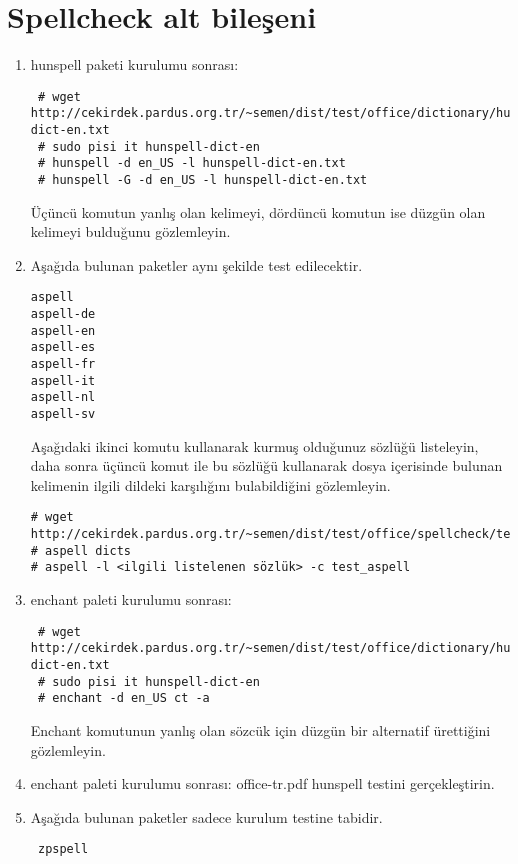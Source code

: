 \documentclass[a4paper,10pt]{article}
\begin{document}
\section{ Spellcheck alt bileşeni}
\begin{enumerate}
\item hunspell paketi kurulumu sonrası:

\begin{verbatim}
 # wget http://cekirdek.pardus.org.tr/~semen/dist/test/office/dictionary/hunspell-dict-en.txt
 # sudo pisi it hunspell-dict-en
 # hunspell -d en_US -l hunspell-dict-en.txt
 # hunspell -G -d en_US -l hunspell-dict-en.txt
\end{verbatim}
Üçüncü komutun yanlış olan kelimeyi, dördüncü komutun ise düzgün olan kelimeyi bulduğunu gözlemleyin.

\item Aşağıda bulunan paketler aynı şekilde test edilecektir.
\begin{verbatim}
aspell
aspell-de
aspell-en
aspell-es
aspell-fr
aspell-it
aspell-nl
aspell-sv 
\end{verbatim}

Aşağıdaki ikinci komutu kullanarak kurmuş olduğunuz sözlüğü listeleyin, daha sonra üçüncü komut ile bu sözlüğü kullanarak dosya içerisinde bulunan kelimenin ilgili dildeki karşılığını bulabildiğini gözlemleyin.
\begin{verbatim}
# wget http://cekirdek.pardus.org.tr/~semen/dist/test/office/spellcheck/test_aspell
# aspell dicts
# aspell -l <ilgili listelenen sözlük> -c test_aspell
\end{verbatim}
\item enchant paleti kurulumu sonrası:
\begin{verbatim}
 # wget http://cekirdek.pardus.org.tr/~semen/dist/test/office/dictionary/hunspell-dict-en.txt
 # sudo pisi it hunspell-dict-en
 # enchant -d en_US ct -a
\end{verbatim}
Enchant komutunun yanlış olan sözcük için düzgün bir alternatif ürettiğini gözlemleyin.

\item enchant paleti kurulumu sonrası:
office-tr.pdf hunspell testini gerçekleştirin.
\item Aşağıda bulunan paketler sadece kurulum testine tabidir.
\begin{verbatim}
 zpspell
\end{verbatim}

\end{enumerate}
\end{document}
